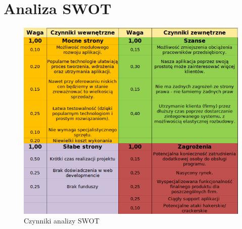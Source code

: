 \documentclass[12pt]{article}
\begin{document}
	\section{Analiza SWOT}
	\begin{figure}[H]
		\centering
		\includegraphics[scale=1.0]{img/swot1.png}
		\caption{Czynniki analizy SWOT}
	\end{figure}
\end{document}
